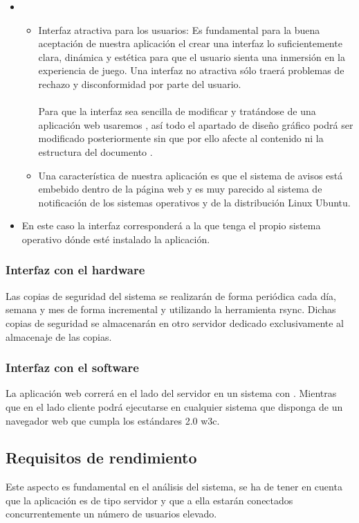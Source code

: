 \begin{itemize}
\item {}
  \begin{itemize}
  \item Interfaz atractiva para los usuarios: Es fundamental para la buena
    aceptación de nuestra aplicación el crear una interfaz lo suficientemente
    clara, dinámica y estética para que el usuario sienta una inmersión en la
    experiencia de juego. Una interfaz no atractiva sólo traerá problemas de
    rechazo y disconformidad por parte del usuario.\\\\
    Para que la interfaz sea sencilla de modificar y tratándose de una
    aplicación web usaremos , así todo el apartado
    de diseño gráfico podrá ser modificado posteriormente sin que por ello
    afecte al contenido ni la estructura del documento .
  \item Una característica de nuestra aplicación es que el sistema de avisos
    está embebido dentro de la página web y es muy parecido al sistema de
    notificación de los sistemas operativos  y de la \cursiva
    {distribución Linux Ubuntu}.
  \end{itemize}
\item {} En este caso la interfaz corresponderá a la que
  tenga el propio sistema operativo dónde esté instalado la aplicación.
\end{itemize}
\subsubsection{Interfaz con el hardware}
Las copias de seguridad del sistema se realizarán de forma periódica cada día, semana y mes de forma incremental y utilizando la herramienta rsync. Dichas copias de seguridad se almacenarán en otro
servidor dedicado exclusivamente al almacenaje de las copias.

\subsubsection{Interfaz con el software}
La aplicación web correrá en el lado del servidor en un sistema 
con . Mientras que en el lado cliente podrá
ejecutarse en cualquier sistema que disponga de un navegador web que cumpla los
estándares 2.0 w3c.

\subsection{Requisitos de rendimiento}
Este aspecto es fundamental en el análisis del sistema, se ha de tener en cuenta que la aplicación es de
tipo servidor y que a ella estarán conectados concurrentemente un número de
usuarios elevado.

